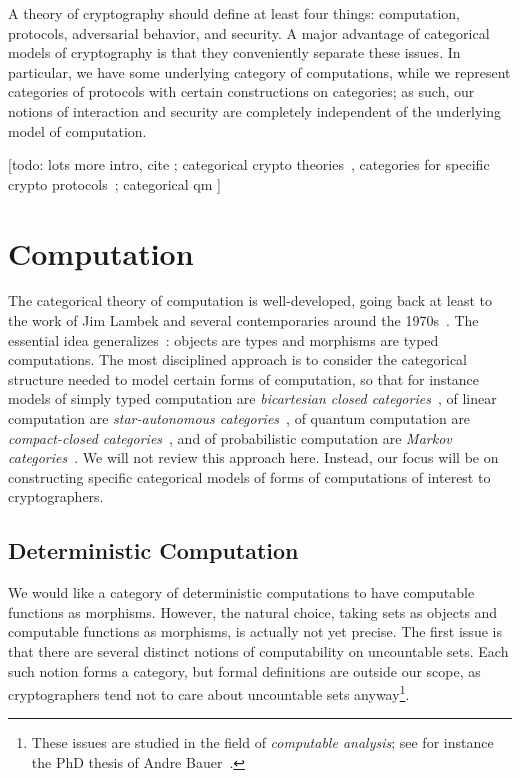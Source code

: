 A theory of cryptography should define at least four things: computation,
protocols, adversarial behavior, and security. A major advantage of categorical
models of cryptography is that they conveniently separate these issues. In
particular, we have some underlying category of computations, while we represent
categories of protocols with certain constructions on categories; as such, our
notions of interaction and security are completely independent of the underlying
model of computation.

[todo: lots more intro,
cite \cite{broadbent-karvonen-2022};
categorical crypto theories~\cite{hines-2020,pavlovic-2012,pavlovic-2014,stay-vicary-2013},
categories for specific crypto protocols~\cite{bkm-2019, bmr-2019}; categorical
qm
\cite{abramsky-coecke-2004,coecke-perdrix-2012,heunen-vicary-2014,coecke-kissinger-2017,chitambar-gour-2019}]

\section{Computation}
\label{sec:computation}

The categorical theory of computation is well-developed, going back at least to
the work of Jim Lambek and several contemporaries around the
1970s~\cite{lambeck-1974,lambeck-1980,lawvere-1969,seely-1984}. The essential
idea generalizes~: objects are types
and morphisms are typed computations. The most disciplined approach is to
consider the categorical structure needed to model certain forms of computation, so that
for instance models of simply typed computation are \emph{bicartesian closed
categories}~\cite{lambeck-1974}, of linear computation are \emph{star-autonomous
categories}~\cite{seely-1989}, of quantum computation are \emph{compact-closed
categories}~\cite{abramsky-coecke-2004}, and of probabilistic computation are \emph{Markov
categories}~\cite{fritz-2020}. We will not review this approach here. Instead,
our focus will be on constructing specific categorical models of forms of
computations of interest to cryptographers.

\subsection{Deterministic Computation}

We would like a category of deterministic computations to have computable
functions as morphisms. However, the natural choice, taking sets as objects and
computable functions as morphisms, is actually not yet precise. The first issue
is that there are several distinct notions of computability on uncountable sets.
Each such notion forms a category, but formal definitions are outside our scope,
as cryptographers tend not to care about uncountable sets anyway\footnote{These
issues are studied in the field of \emph{computable analysis}; see for instance
the PhD thesis of Andre Bauer~\cite{bauer-2000}.}.

